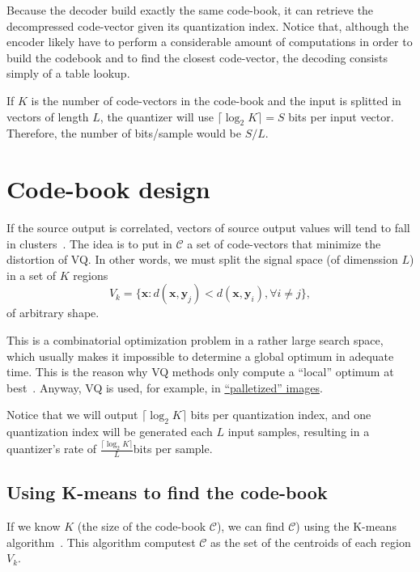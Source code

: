 Because the decoder build exactly the same code-book, it can retrieve
the decompressed code-vector given its quantization index. Notice
that, although the encoder likely have to perform a considerable
amount of computations in order to build the codebook and to find the
closest code-vector, the decoding consists simply of a table lookup.

If $K$ is the number of code-vectors in the code-book and the input is
splitted in vectors of length $L$, the quantizer will use
$\lceil\log_2 K\rceil=S$ bits per input vector. Therefore, the number
of bits/sample would be $S/L$.


\section{Code-book design}

If the source output is correlated, vectors of source output values
will tend to fall in clusters~\cite{sayood2017introduction}. The idea
is to put in $\mathcal{C}$ a set of code-vectors that minimize the
distortion of VQ. In other words, we must split the signal space (of
dimenssion $L$) in a set of $K$ regions
\begin{equation}
  V_k=\{\mathbf{x}:d(\mathbf{x},\mathbf{y}_j) <
  d(\mathbf{x},\mathbf{y}_i), \forall i\ne j\},
\end{equation}
of arbitrary shape.

This is a combinatorial optimization problem in a rather large search
space, which usually makes it impossible to determine a global optimum
in adequate time. This is the reason why VQ methods only compute a
``local'' optimum at best~\cite{burger2016digital}. Anyway, VQ is
used, for example, in
\href{https://en.wikipedia.org/wiki/Palette_(computing)}{``palletized''
  images}.

Notice that we will output $\lceil\log_2 K\rceil$ bits per
quantization index, and one quantization index will be generated each
$L$ input samples, resulting in a quantizer's rate of
$\frac{\lceil\log_2 K\rceil}{L}$bits per sample.

  
\subsection{Using K-means to find the code-book}

If we know $K$ (the size of the code-book $\mathcal{C}$), we can find
$\mathcal{C}$) using the K-means
algorithm~\cite{hartigan1979algorithm,sayood2017introduction}. This
algorithm computest $\mathcal{C}$ as the set of the centroids of each
region $V_k$.

